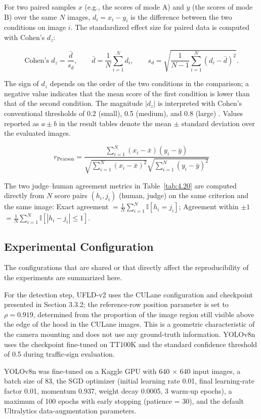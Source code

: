 \documentclass[12pt,a4paper]{report}
\begin{document}
For two paired samples $x$ (e.g., the scores of mode A) and $y$ (the scores of mode B) over the same $N$ images, $d_i=x_i-y_i$ is the difference between the two conditions on image $i$. The standardized effect size for paired data is computed with Cohen's $d_z$:

\[
\text{Cohen's } d_z = \frac{\bar{d}}{s_d},
\qquad
\bar{d} = \frac{1}{N}\sum_{i=1}^{N}d_i,
\qquad
s_d = \sqrt{\frac{1}{N-1}\sum_{i=1}^{N}(d_i-\bar{d})^2}.
\]

The sign of $d_z$ depends on the order of the two conditions in the comparison; a negative value indicates that the mean score of the first condition is lower than that of the second condition. The magnitude $|d_z|$ is interpreted with Cohen's conventional thresholds of 0.2 (small), 0.5 (medium), and 0.8 (large) \cite{cohen1988power}. Values reported as $a \pm b$ in the result tables denote the mean $\pm$ standard deviation over the evaluated images.

\[
r_{\text{Pearson}} = \frac{\sum_{i=1}^{N} (x_i - \bar{x})(y_i - \bar{y})}{\sqrt{\sum_{i=1}^{N} (x_i - \bar{x})^2} \sqrt{\sum_{i=1}^{N} (y_i - \bar{y})^2}}
\]

The two judge--human agreement metrics in Table~\ref{tab:4.20} are computed directly from $N$ score pairs $(h_i, j_i)$ (human, judge) on the same criterion and the same image: Exact agreement $= \frac{1}{N}\sum_{i=1}^{N}\mathbb{I}[h_i = j_i]$; Agreement within $\pm 1$ $= \frac{1}{N}\sum_{i=1}^{N}\mathbb{I}[|h_i - j_i| \le 1]$.

\subsection{Experimental Configuration}

The configurations that are shared or that directly affect the reproducibility of the experiments are summarized here.

For the detection step, UFLD-v2 uses the CULane configuration and checkpoint presented in Section 3.3.2; the reference-row position parameter is set to $\rho=0.919$, determined from the proportion of the image region still visible above the edge of the hood in the CULane images. This is a geometric characteristic of the camera mounting and does not use any ground-truth information. YOLOv8n uses the checkpoint fine-tuned on TT100K and the standard confidence threshold of 0.5 during traffic-sign evaluation.

YOLOv8n was fine-tuned on a Kaggle GPU with 640 $\times$ 640 input images, a batch size of 83, the SGD optimizer (initial learning rate 0.01, final learning-rate factor 0.01, momentum 0.937, weight decay 0.0005, 3 warm-up epochs), a maximum of 100 epochs with early stopping (patience = 30), and the default Ultralytics data-augmentation parameters.
\end{document}
